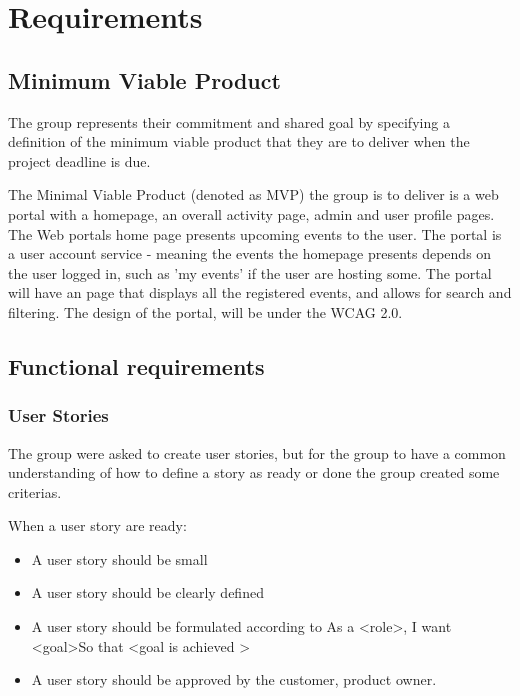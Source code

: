 
\chapter{Requirements}

\section{Minimum Viable Product}
\label{MVP}
The group represents their commitment and shared goal by specifying a definition of the minimum viable product that they are to deliver when the project deadline is due.

The Minimal Viable Product (denoted as MVP) the group is to deliver is a web portal with a homepage, an overall activity page, admin and user profile pages. The Web portals home page presents upcoming events to the user. The portal is a user account service - meaning the events the homepage presents depends on the user logged in, such as 'my events'  if the user are hosting some. The portal will have an page that displays all the registered events, and allows for search and filtering. 
The design of the portal, will be under the WCAG 2.0.

\section{Functional requirements}
\subsection{User Stories}
\label{User stories}
The group were asked to create user stories, but for the group to have a common understanding of how to define a story as ready or done the group created some criterias. 

\begin{description}
    \item[When a user story are ready:]
\end{description}
\begin{itemize}[noitemsep]
    \item A user story should be small
    \item A user story should be clearly defined
    \item A user story should be formulated according to As a \textless role\textgreater, I want \textless goal\textgreater So that \textless goal is achieved \textgreater
    \item A user story should be approved by the customer, product owner.
\end{itemize}

